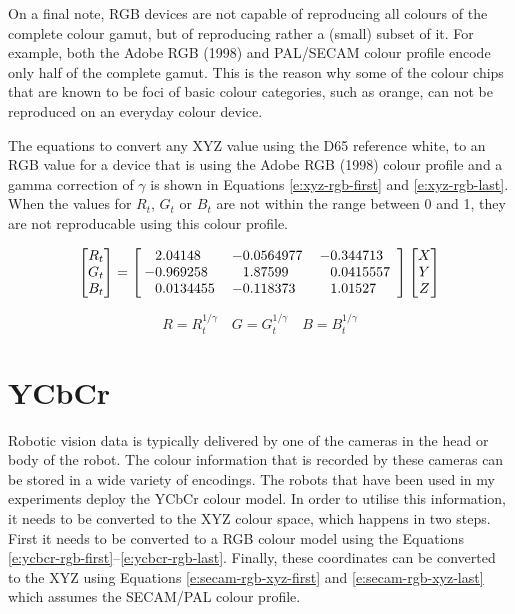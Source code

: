 On a final note, RGB devices are not capable of reproducing all
colours of the complete colour gamut, but of reproducing rather a
(small) subset of it. For example, both the Adobe RGB (1998) and
PAL/SECAM colour profile encode only half of the complete gamut. This
is the reason why some of the colour chips that are known to be foci
of basic colour categories, such as orange, can not be reproduced on
an everyday colour device.

The equations to convert any XYZ value using the D65 reference white,
to an RGB value for a device that is using the Adobe RGB (1998) colour
profile and a gamma correction of $\gamma$ is shown in Equations
\ref{e:xyz-rgb-first} and \ref{e:xyz-rgb-last}. When the values for
$R_t$, $G_t$ or $B_t$ are not within the range between 0 and 1, they
are not reproducable using this colour profile.

\begin{equation}
\begin{bmatrix}
  R_t \\ G_t \\ B_t
\end{bmatrix}
= \left[
\setlength{\arraycolsep}{10pt} \sisetup{group-digits = false}
\begin{array}{S[table-format=1.7] S[table-format=1.7] S[table-format=1.6]}
 2.04148 & -0.0564977 & -0.344713 \\
-0.969258 & 1.87599& 0.0415557 \\
0.0134455  &  -0.118373 & 1.01527
\end{array}
\right]
\begin{bmatrix}
  X \\ Y \\ Z
\end{bmatrix}
\label{e:xyz-rgb-first}
\end{equation}

\begin{equation}
R = R_t^{1/\gamma} \quad G = G_t^{1/\gamma} \quad B = B_t^{1/\gamma}
\label{e:xyz-rgb-last}
\end{equation}

\section{YCbCr}
\label{s:ycbcr}

Robotic vision data is typically delivered by one of the cameras in
the head or body of the robot. The colour information that is recorded
by these cameras can be stored in a wide variety of encodings. The
robots that have been used in my experiments deploy the YCbCr colour
model. In order to utilise this information, it needs to be converted
to the XYZ colour space, which happens in two steps. First it needs to
be converted to a RGB colour model using the Equations
\ref{e:ycbcr-rgb-first}--\ref{e:ycbcr-rgb-last}. Finally, these
coordinates can be converted to the XYZ using Equations
\ref{e:secam-rgb-xyz-first} and \ref{e:secam-rgb-xyz-last} which
assumes the SECAM/PAL colour profile.

